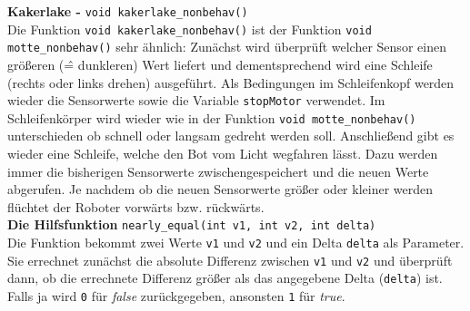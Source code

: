\noindent \textbf{Kakerlake - }\verb+void kakerlake_nonbehav()+\\

Die Funktion \verb+void kakerlake_nonbehav()+ ist der Funktion \verb+void motte_nonbehav()+ sehr ähnlich:
Zunächst wird überprüft welcher Sensor einen größeren (\^= dunkleren) Wert liefert und dementsprechend wird eine Schleife (rechts oder links drehen) ausgeführt. Als Bedingungen im Schleifenkopf werden wieder die Sensorwerte sowie die Variable \verb+stopMotor+ verwendet. Im Schleifenkörper wird wieder wie in der Funktion \verb+void motte_nonbehav()+ unterschieden ob schnell oder langsam gedreht werden soll.
Anschließend gibt es wieder eine Schleife, welche den Bot vom Licht wegfahren lässt. Dazu werden immer die bisherigen Sensorwerte zwischengespeichert und die neuen Werte abgerufen. Je nachdem ob die neuen Sensorwerte größer oder kleiner werden flüchtet der Roboter vorwärts bzw. rückwärts.\\

\noindent \textbf{Die Hilfsfunktion }\verb+nearly_equal(int v1, int v2, int delta)+\\

Die Funktion bekommt zwei Werte \verb+v1+ und \verb+v2+ und ein Delta \verb+delta+ als Parameter. Sie errechnet zunächst die absolute Differenz zwischen  \verb+v1+ und \verb+v2+ und überprüft dann, ob die errechnete Differenz größer als das angegebene Delta (\verb+delta+) ist. Falls ja wird \verb+0+ für \textit{false} zurückgegeben, ansonsten \verb+1+ für \textit{true}.

